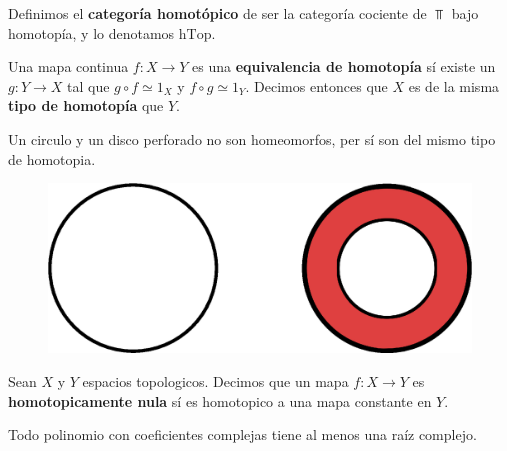 \begin{definition}
    Definimos el \textbf{categor\'ia homot\'opico} de ser la categor\'ia
    cociente de $\Top$ bajo homotop\'ia, y lo denotamos  $\text{hTop}$.
\end{definition}

\begin{definition}
    Una mapa continua $f:X \xrightarrow{} Y$ es una \textbf{equivalencia de
    homotop\'ia} s\'i existe un $g:Y \xrightarrow{} X$ tal que $g \circ f \simeq
    1_X$ y  $f \circ g \simeq 1_Y$. Decimos entonces que $X$ es de la misma
    \textbf{tipo de homotop\'ia} que $Y$.
\end{definition}

\begin{example}\label{}
    Un circulo y un disco perforado no son homeomorfos, per s\'i son del mismo
    tipo de homotopia.
    \begin{figure}[h]
        \centering
        \includegraphics[scale=0.5]{Figures/homotopy_equivalence.eps}
        \caption{}
        \label{fig_15}
    \end{figure}
\end{example}

\begin{definition}
    Sean $X$ y  $Y$ espacios topologicos. Decimos que un mapa $f:X
    \xrightarrow{} Y$ es \textbf{homotopicamente nula} s\'i es homotopico a una
    mapa constante en $Y$.
\end{definition}

\begin{theorem}\label{thm_5.11}
    Todo polinomio con coeficientes complejas tiene al menos una ra\'iz
    complejo.
\end{theorem}

